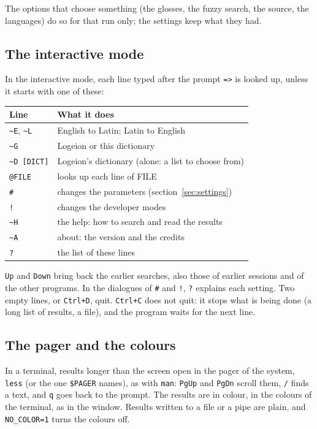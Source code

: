 \documentclass[12pt,
              article,
              oneside
              ]{memoir}
\newcommand*{\key}[1]{\texttt{#1}}
\newcommand*{\tl}{\textasciitilde}
\begin{document}
\noindent
The options that choose something (the glosses, the fuzzy search, the
source, the languages) do so for that run only; the settings keep what
they had.

\subsection{The interactive mode}

%
In the interactive mode, each line typed after the prompt \texttt{=>} is
looked up, unless it starts with one of these:

\begin{longtable}{@{}>{\raggedright}p{}p{}@{}}
\toprule
Line & What it does\\
\midrule
\endhead
\texttt{\tl E}, \texttt{\tl L} & English to Latin; Latin to English\\
\texttt{\tl G} & Logeion or this dictionary\\
\texttt{\tl D [DICT]} & Logeion's dictionary (alone: a list to choose from)\\
\texttt{@FILE} & looks up each line of FILE\\
\texttt{\#} & changes the parameters (section~\ref{sec:settings})\\
\texttt{!} & changes the developer modes\\
\texttt{\tl H} & the help: how to search and read the results\\
\texttt{\tl A} & about: the version and the credits\\
\texttt{?} & the list of these lines\\
\bottomrule
\end{longtable}

\noindent{}%
\key{Up} and \key{Down} bring back the earlier searches, also those of
earlier sessions and of the other programs. In the dialogues of
\texttt{\#} and \texttt{!}, \texttt{?} explains each setting. Two empty
lines, or \key{Ctrl+D}, quit. \key{Ctrl+C} does not quit: it stops what is
being done (a long list of results, a file), and the program waits for
the next line.

\subsection{The pager and the colours}

%
In a terminal, results longer than the screen open in the pager of the
system, \texttt{less} (or the one \texttt{\$PAGER} names), as with
\texttt{man}: \key{PgUp} and \key{PgDn} scroll them, \texttt{/} finds a
text, and \texttt{q} goes back to the prompt. The results are in colour,
in the colours of the terminal, as in the window. Results written to a
file or a pipe are plain, and \texttt{NO\_COLOR=1} turns the colours off.
\end{document}
